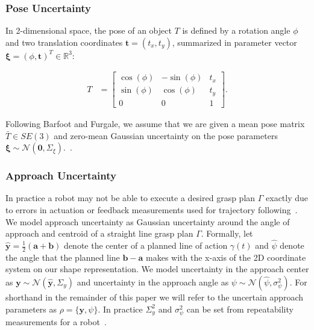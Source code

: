 \documentclass[a4paper, 10pt, conference]{ieeeconf}      %
\newcommand{\ba}{\mathbf{a}}
\newcommand{\bb}{\mathbf{b}}
\newcommand{\bt}{\mathbf{t}}
\newcommand{\by}{\mathbf{y}}
\newcommand{\mN}{\mathcal{N}}
\begin{document}
\subsubsection{Pose Uncertainty}
In 2-dimensional space, the pose of an object $T$ is defined by a rotation angle $\phi$ and two translation coordinates $\bt = (t_x, t_y)$, summarized in parameter vector $\mathbf{\xi} = (\phi, \bt)^T \in \mathbb{R}^3$:

\vspace{-2ex}
\begin{align*}
	T &= \left[  \begin{array}{ccc}
		\cos(\phi) & -\sin(\phi) & t_x \\
		\sin(\phi) & \cos(\phi) & t_y \\
		0 & 0 & 1
		\end{array} \right] .
\end{align*}

\noindent Following Barfoot and Furgale, we assume that we are given a mean pose matrix $\bar{T} \in SE(3)$ and zero-mean Gaussian uncertainty on the pose parameters $\mathbf{\xi} \sim \mN \left( \mathbf{0}, \Sigma_{\xi} \right)$.~\cite{barfoot2014Pose}.

 
 \subsubsection{Approach Uncertainty}
In practice a robot may not be able to execute a desired grasp plan $\Gamma$ exactly due to errors in actuation or feedback measurements used for trajectory following~\cite{kehoe2012estimating}.
We model approach uncertainty as Gaussian uncertainty around the angle of approach and centroid of a straight line grasp plan $\Gamma$.
Formally, let $\hat{\by} = \frac{1}{2} (\ba + \bb)$ denote the center of a planned line of action $\gamma(t)$ and $\hat{\psi}$ denote the angle that the planned line $\bb - \ba$ makes with the x-axis of the 2D coordinate system on our shape representation.
We model uncertainty in the approach center as $\by \sim \mN(\hat{\by}, \Sigma_y)$ and uncertainty in the approach angle as $\psi \sim \mN(\hat{\psi}, \sigma_{\psi}^2)$.
For shorthand in the remainder of this paper we will refer to the uncertain approach parameters as $\rho = \{\by, \psi \}$.
In practice $\Sigma_{y}^2$ and $\sigma_{\psi}^2$ can be set from repeatability measurements for a robot~\cite{mooring1986determination}.
\end{document}
